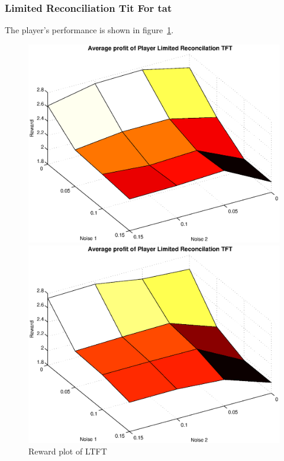 \subsubsection{Limited Reconciliation Tit For tat}
The player's performance is shown in figure~\ref{pic player lrtft}.\\
\begin{figure}[h]
	\caption{Reward plot of LTFT}
	\label{pic player lrtft}
\begin{minipage}[hbt]{0.65\textwidth}
	\centering
	\includegraphics[width=\textwidth]{pics/simulation1/Reward_vs_Noise_of_Player_Limited_Reconcilation_TFT}
\end{minipage}
\hfill
\begin{minipage}[hbt]{0.3\textwidth}
	\centering
	\includegraphics[width=\textwidth]{pics/simulation2/Reward_vs_Noise_of_Player_Limited_Reconcilation_TFT}
\end{minipage}

\end{figure}

